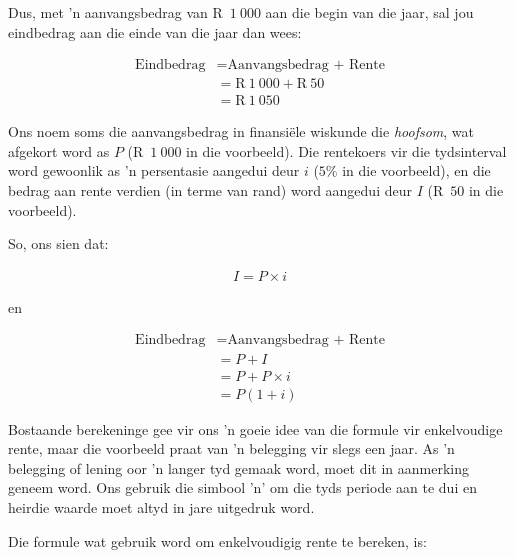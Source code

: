 Dus, met ’n aanvangsbedrag van R~$1~000$ aan die begin van die jaar, sal jou eindbedrag aan die einde van die jaar dan wees:\par 
\begin{align*}
    \mbox{Eindbedrag} &= \mbox{Aanvangsbedrag + Rente}\\
    &= \mbox{R}~1~000 + \mbox{R}~50\\
    &= \mbox{R}~1~050
\end{align*}

Ons noem soms die aanvangsbedrag in finansiële wiskunde die \textit{hoofsom}, wat afgekort word as $P$ (R~$1~000$ in die voorbeeld). Die rentekoers vir die tydsinterval word gewoonlik as ’n persentasie aangedui deur $i$ ($5\%$ in die voorbeeld),  en die bedrag aan rente verdien (in terme van rand) word aangedui deur $I$ (R~$50$ in die voorbeeld).\par 

So, ons sien dat:
        
\begin{align*}
    I = P \times i
\end{align*}

en

\begin{align*}
    \mbox{Eindbedrag} &= \mbox{Aanvangsbedrag + Rente} \nonumber\\
    &= P + I \nonumber\\
    &= P + P \times i\nonumber\\
    &= P(1 + i)
\end{align*}



Bostaande berekeninge gee vir ons 'n goeie idee van die formule vir enkelvoudige rente, maar die voorbeeld praat van 'n belegging vir slegs een jaar. As 'n belegging of lening oor 'n langer tyd gemaak word, moet dit in aanmerking geneem word. Ons gebruik die simbool 'n' om die tyds periode aan te dui en heirdie waarde moet altyd in jare uitgedruk word.\par

Die formule wat gebruik word om enkelvoudigig rente te bereken, is:





